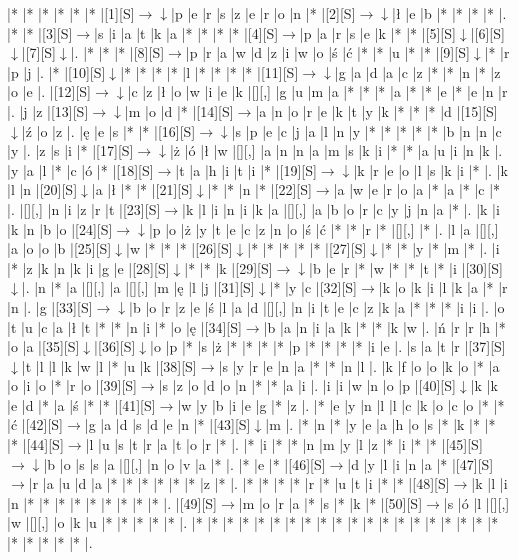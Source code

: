 \documentclass[11pt]{article}
\newcommand\drarr{$\rightarrow \!\!\!\!\! \downarrow$}
\newcommand\rarr{$\rightarrow$}
\newcommand\darr{$\downarrow$}
\begin{document}
\noindent\begin{Puzzle}{24}{27}|*	|*	|*	|*	|*	|*	|[1][S]\drarr	|p	|e	|r	|s	|z	|e	|r	|o	|n	|*	|[2][S]\drarr	|ł	|e	|b	|*	|*	|*	|*	|.
|*	|*	|[3][S]\rarr	|s	|i	|a	|t	|k	|a	|*	|*	|*	|*	|[4][S]\rarr	|p	|a	|r	|s	|e	|k	|*	|*	|[5][S]\darr	|[6][S]\darr	|[7][S]\darr	|.
|*	|*	|*	|[8][S]\rarr	|p	|r	|a	|w	|d	|z	|i	|w	|o	|ś	|ć	|*	|*	|u	|*	|*	|[9][S]\darr	|*	|r	|p	|j	|.
|*	|[10][S]\darr	|*	|*	|*	|*	|l	|*	|*	|*	|*	|[11][S]\drarr	|g	|a	|d	|a	|c	|z	|*	|*	|n	|*	|z	|o	|e	|.
|[12][S]\drarr	|c	|z	|ł	|o	|w	|i	|e	|k	|[][,]{ }	|g	|u	|m	|a	|*	|*	|*	|a	|*	|*	|e	|*	|e	|n	|r	|.
|j	|z	|[13][S]\drarr	|m	|o	|d	|*	|[14][S]\rarr	|a	|n	|o	|r	|e	|k	|t	|y	|k	|*	|*	|*	|d	|[15][S]\darr	|ź	|o	|z	|.
|ę	|e	|s	|*	|*	|[16][S]\drarr	|s	|p	|e	|c	|j	|a	|l	|n	|y	|*	|*	|*	|*	|*	|b	|n	|n	|c	|y	|.
|z	|s	|i	|*	|[17][S]\drarr	|ż	|ó	|ł	|w	|[][,]{ }	|a	|n	|n	|a	|m	|s	|k	|i	|*	|*	|a	|u	|i	|n	|k	|.
|y	|a	|l	|*	|c	|ó	|*	|[18][S]\rarr	|t	|a	|h	|i	|t	|i	|*	|[19][S]\drarr	|k	|r	|e	|o	|l	|s	|k	|i	|*	|.
|k	|l	|n	|[20][S]\darr	|a	|ł	|*	|*	|[21][S]\darr	|*	|*	|n	|*	|[22][S]\rarr	|a	|w	|e	|r	|o	|a	|*	|a	|*	|c	|*	|.
|[][,]{ }	|n	|i	|z	|r	|t	|[23][S]\rarr	|k	|l	|i	|n	|i	|k	|a	|[][,]{ }	|a	|b	|o	|r	|c	|y	|j	|n	|a	|*	|.
|k	|i	|k	|n	|b	|o	|[24][S]\drarr	|p	|o	|ż	|y	|t	|e	|c	|z	|n	|o	|ś	|ć	|*	|*	|r	|*	|[][,]{ }	|*	|.
|l	|a	|[][,]{ }	|a	|o	|o	|b	|[25][S]\darr	|w	|*	|*	|*	|[26][S]\darr	|*	|*	|*	|*	|*	|[27][S]\darr	|*	|*	|y	|*	|m	|*	|.
|i	|*	|z	|k	|n	|k	|i	|g	|e	|[28][S]\darr	|*	|*	|k	|[29][S]\drarr	|b	|e	|r	|*	|w	|*	|*	|t	|*	|i	|[30][S]\darr	|.
|n	|*	|a	|[][,]{ }	|a	|[][,]{ }	|m	|ę	|l	|j	|[31][S]\darr	|*	|y	|c	|[32][S]\rarr	|k	|o	|k	|i	|l	|k	|a	|*	|r	|n	|.
|g	|[33][S]\drarr	|b	|o	|r	|z	|e	|ś	|l	|a	|d	|[][,]{ }	|n	|i	|t	|e	|c	|z	|k	|a	|*	|*	|*	|i	|i	|.
|o	|t	|u	|c	|a	|ł	|t	|*	|*	|n	|i	|*	|o	|ę	|[34][S]\rarr	|b	|a	|n	|i	|a	|k	|*	|*	|k	|w	|.
|ń	|r	|r	|h	|*	|o	|a	|[35][S]\darr	|[36][S]\darr	|o	|p	|*	|s	|ż	|*	|*	|*	|*	|p	|*	|*	|*	|*	|i	|e	|.
|s	|a	|t	|r	|[37][S]\darr	|t	|l	|l	|k	|w	|l	|*	|u	|k	|[38][S]\rarr	|s	|y	|r	|e	|n	|a	|*	|*	|n	|l	|.
|k	|f	|o	|o	|k	|o	|*	|a	|o	|i	|o	|*	|r	|o	|[39][S]\rarr	|s	|z	|o	|d	|o	|n	|*	|*	|a	|i	|.
|i	|i	|w	|n	|o	|p	|[40][S]\darr	|k	|k	|e	|d	|*	|a	|ś	|*	|*	|[41][S]\rarr	|w	|y	|b	|i	|e	|g	|*	|z	|.
|*	|e	|y	|n	|l	|l	|c	|k	|o	|c	|o	|*	|*	|ć	|[42][S]\rarr	|g	|a	|d	|s	|d	|e	|n	|*	|[43][S]\darr	|m	|.
|*	|n	|*	|y	|e	|a	|h	|o	|s	|*	|k	|*	|*	|*	|[44][S]\rarr	|l	|u	|s	|t	|r	|a	|t	|o	|r	|*	|.
|*	|i	|*	|*	|n	|m	|y	|l	|z	|*	|i	|*	|*	|[45][S]\drarr	|b	|o	|s	|s	|a	|[][,]{ }	|n	|o	|v	|a	|*	|.
|*	|e	|*	|[46][S]\rarr	|d	|y	|l	|i	|n	|a	|*	|[47][S]\rarr	|r	|a	|u	|d	|a	|*	|*	|*	|*	|*	|*	|z	|*	|.
|*	|*	|*	|*	|r	|*	|u	|t	|i	|*	|*	|[48][S]\rarr	|k	|l	|i	|n	|*	|*	|*	|*	|*	|*	|*	|*	|*	|.
|[49][S]\rarr	|m	|o	|r	|a	|*	|s	|*	|k	|*	|[50][S]\rarr	|s	|ó	|l	|[][,]{ }	|w	|[][,]{ }	|o	|k	|u	|*	|*	|*	|*	|*	|.
|*	|*	|*	|*	|*	|*	|*	|*	|*	|*	|*	|*	|*	|*	|*	|*	|*	|*	|*	|*	|*	|*	|*	|*	|*	|.\end{Puzzle}
\end{document}
